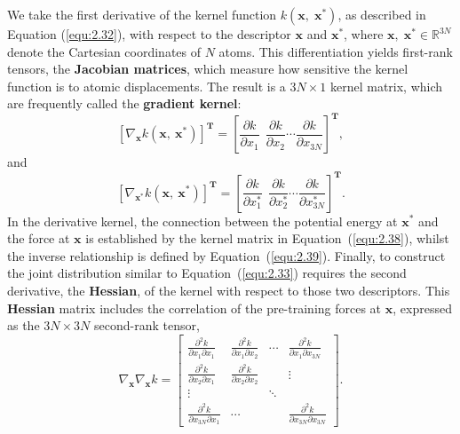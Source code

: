 We take the first derivative of the kernel function \( k(\mathbf{x},\; \mathbf{x}^{*}) \), as described in Equation (\ref{equ:2.32}), with respect to the descriptor \(\mathbf{x}\) and \(\mathbf{x}^{*}\), where \(\mathbf{x},\; \mathbf{x}^{*} \in \mathbb{R}^{3N}\) denote the Cartesian coordinates of \(N\) atoms. 
This differentiation yields first-rank tensors, the \textbf{Jacobian matrices}, which measure how sensitive the kernel function is to atomic displacements. The result is a \(3N \times 1\) kernel matrix, which are frequently called the \textbf{gradient kernel}:
\begin{equation}
    \label{equ:2.38}
    \left[\nabla_{\mathbf{x}} k(\mathbf{x},\:\mathbf{x}^{*})\right]^{\textbf{T}}
    = \left[\frac{\partial k}{\partial x_{1}}\ \ \frac{\partial k}{\partial x_{2}}\cdots\frac{\partial k}{\partial x_{3N}} \right]^{\textbf{T}},
\end{equation}   
and
\begin{equation}
    \label{equ:2.39}
    \left[\nabla_{\mathbf{x}^{*}} k(\mathbf{x},\:\mathbf{x}^{*})\right]^{\textbf{T}}
    = \left[\frac{\partial k}{\partial x^{*}_{1}}\ \ \frac{\partial k}{\partial x^{*}_{2}}\cdots\frac{\partial k}{\partial x^{*}_{3N}} \right]^{\textbf{T}}.
\end{equation}
In the derivative kernel, the connection between the potential energy at \(\mathbf{x}^{*}\) and the force at \(\mathbf{x}\) is established by the kernel matrix in Equation~(\ref{equ:2.38}), whilst the inverse relationship is defined by Equation~(\ref{equ:2.39}).
Finally, to construct the joint distribution similar to Equation~(\ref{equ:2.33}) requires the second derivative, the \textbf{Hessian}, of the kernel with respect to those two descriptors.
This \textbf{Hessian} matrix includes the correlation of the pre-training forces at \(\mathbf{x}\), expressed as the $3N\times 3N$ second-rank tensor,
\begin{equation}
    \label{equ:2.40}
    \nabla_{\mathbf{x}}\nabla_{\mathbf{x}} k
    =
    \begin{bmatrix}
            \frac{\partial^{2} k}{\partial x_{1}\partial x_{1}} & \frac{\partial^{2} k}{\partial x_{1}\partial x_{2}}& \cdots&\frac{\partial^{2} k}{\partial x_{1}\partial x_{3N}} \\
            \frac{\partial^{2} k}{\partial x_{2}\partial x_{1}} & \frac{\partial^{2} k}{\partial x_{2}\partial x_{2}}& &  \vdots\\
            \vdots &  & \ddots & \\
            \frac{\partial^{2} k}{\partial x_{3N}\partial x_{1}}& \cdots &  &  \frac{\partial^{2} k}{\partial x_{3N}\partial x_{3N}}
        \end{bmatrix}.
\end{equation}

